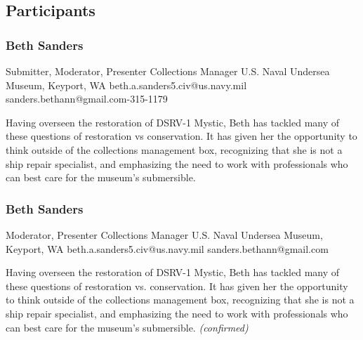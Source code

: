 \documentclass{report}
\begin{document}
            \subsection*{Participants}
              \subsubsection*{ Beth Sanders }
              Submitter, Moderator, Presenter\newline
              Collections Manager\newline
              U.S. Naval Undersea Museum, Keyport, WA
              \newline
              beth.a.sanders5.civ@us.navy.mil\newline
              sanders.bethann@gmail.com-315-1179\newline

              Having overseen the restoration of DSRV-1 Mystic, Beth has tackled many of these questions of restoration vs conservation. It has given her the opportunity to think outside of the collections management box, recognizing that she is not a ship repair specialist, and emphasizing the need to work with professionals who can best care for the museum's submersible.\newline


              
                \subsubsection*{ Beth Sanders }
                Moderator, Presenter\newline
                Collections Manager\newline
                U.S. Naval Undersea Museum, Keyport, WA
                \newline
                beth.a.sanders5.civ@us.navy.mil\newline
                sanders.bethann@gmail.com\newline

                Having overseen the restoration of DSRV-1 Mystic, Beth has tackled many of these questions of restoration vs. conservation. It has given her the opportunity to think outside of the collections management box, recognizing that she is not a ship repair specialist, and emphasizing the need to work with professionals who can best care for the museum's submersible.\newline
                \emph{ (confirmed) }
              
\end{document}
